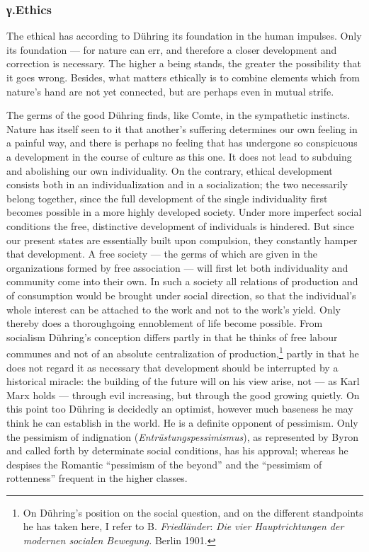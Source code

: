 \documentclass[12pt,a4paper]{book}
\newcommand{\opage}[1]{\marginnote{\footnotesize\textit{[#1]}}}
\begin{document}
\subsubsection*{γ.\quad Ethics}

The ethical has according to Dühring its foundation in the human impulses. Only
its foundation --- for nature can err, and therefore a closer development and
correction is necessary. The higher a being stands, the greater the possibility
that it goes wrong. Besides, what matters ethically is to combine elements which
from nature's hand are not yet connected, but are perhaps even in mutual strife.

The germs of the good Dühring finds, like Comte, in the sympathetic instincts.
Nature has itself seen to it that another's suffering determines our own feeling
in a painful way, and there is perhaps no feeling that has undergone so
conspicuous a development in the course of culture as this one. It does not lead
to subduing and abolishing our own individuality. On the contrary, ethical
development consists both in an individualization and in a socialization; the two
necessarily belong together, since the full development of the single
individuality first becomes possible in a more highly developed society. Under
more imperfect social conditions the free, distinctive development of individuals
is hindered. But since our present states are essentially built upon compulsion,
they constantly hamper that development. A free society --- the germs of which
are given in the organizations formed by free association --- will first let both
individuality and community come into their own. In such a society all relations
of production and of consumption would be brought under social direction, so that
the individual's whole interest can be attached to the work and not to the work's
yield. Only thereby does \opage{565}a thoroughgoing ennoblement of life become possible.
From socialism Dühring's conception differs partly in that he thinks of free
labour communes and not of an absolute centralization of
production,\footnote{On Dühring's position on the social question, and on the
different standpoints he has taken here, I refer to B. \emph{Friedländer}: \textit{Die
vier Hauptrichtungen der modernen socialen Bewegung.} Berlin 1901.} partly in
that he does not regard it as necessary that development should be interrupted by
a historical miracle: the building of the future will on his view arise, not ---
as Karl Marx holds --- through evil increasing, but through the good growing
quietly. On this point too Dühring is decidedly an optimist, however much
baseness he may think he can establish in the world. He is a definite opponent of
pessimism. Only the pessimism of indignation (\textit{Entrüstungspessimismus}),
as represented by Byron and called forth by determinate social conditions, has
his approval; whereas he despises the Romantic ``pessimism of the beyond'' and
the ``pessimism of rottenness'' frequent in the higher classes.
\end{document}
